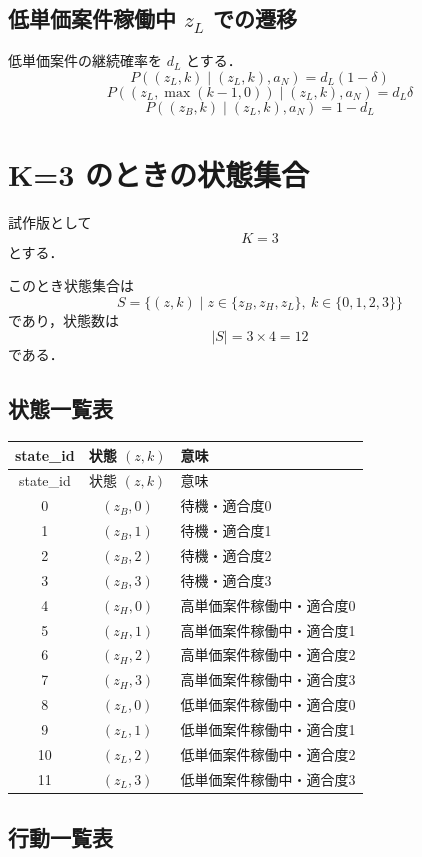 \documentclass[11pt,a4paper]{bxjsarticle}
\begin{document}
\subsection{低単価案件稼働中 \(z_L\) での遷移}

低単価案件の継続確率を \(d_L\) とする．
\[
    P((z_L,k)\mid(z_L,k),a_N)=d_L(1-\delta)
\]
\[
    P((z_L,\max(k-1,0))\mid(z_L,k),a_N)=d_L\delta
\]
\[
    P((z_B,k)\mid(z_L,k),a_N)=1-d_L
\]

\section{K=3 のときの状態集合}

試作版として
\[
    K=3
\]
とする．

このとき状態集合は
\[
    S=\{(z,k)\mid z\in\{z_B,z_H,z_L\},\ k\in\{0,1,2,3\}\}
\]
であり，状態数は
\[
    |S|=3\times 4=12
\]
である．

\subsection{状態一覧表}

\begin{longtable}{ccl}
\toprule
state\_id & 状態 \((z,k)\) & 意味 \\
\midrule
\endfirsthead
\toprule
state\_id & 状態 \((z,k)\) & 意味 \\
\midrule
\endhead
0  & \((z_B,0)\) & 待機・適合度0 \\
1  & \((z_B,1)\) & 待機・適合度1 \\
2  & \((z_B,2)\) & 待機・適合度2 \\
3  & \((z_B,3)\) & 待機・適合度3 \\
4  & \((z_H,0)\) & 高単価案件稼働中・適合度0 \\
5  & \((z_H,1)\) & 高単価案件稼働中・適合度1 \\
6  & \((z_H,2)\) & 高単価案件稼働中・適合度2 \\
7  & \((z_H,3)\) & 高単価案件稼働中・適合度3 \\
8  & \((z_L,0)\) & 低単価案件稼働中・適合度0 \\
9  & \((z_L,1)\) & 低単価案件稼働中・適合度1 \\
10 & \((z_L,2)\) & 低単価案件稼働中・適合度2 \\
11 & \((z_L,3)\) & 低単価案件稼働中・適合度3 \\
\bottomrule
\end{longtable}

\subsection{行動一覧表}
\end{document}
